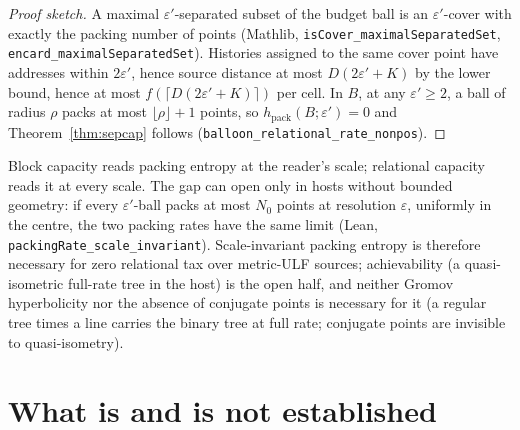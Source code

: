 \documentclass[11pt,a4paper]{article}
\theoremstyle{plain}
\theoremstyle{definition}
\theoremstyle{remark}
\newcommand{\hpack}{h_{\mathrm{pack}}}
\begin{document}
\begin{proof}[Proof sketch]
A maximal $\varepsilon'$-separated subset of the budget ball is an
$\varepsilon'$-cover with exactly the packing number of points (Mathlib,
\texttt{isCover\_maximalSeparatedSet}, \texttt{encard\_maximalSeparatedSet}).
Histories assigned to the same cover point have addresses within
$2\varepsilon'$, hence source distance at most $D(2\varepsilon'+K)$ by the
lower bound, hence at most $f(\lceil D(2\varepsilon'+K)\rceil)$ per cell.
In $B$, at any $\varepsilon'\ge2$, a ball of radius $\rho$ packs at most
$\lfloor\rho\rfloor+1$ points, so $\hpack(B;\varepsilon')=0$ and
Theorem~\ref{thm:sepcap} follows (\texttt{balloon\_relational\_rate\_nonpos}).
\end{proof}

Block capacity reads packing entropy at the reader's scale; relational
capacity reads it at every scale. The gap can open only in hosts without
bounded geometry: if every $\varepsilon'$-ball packs at most $N_0$ points at
resolution $\varepsilon$, uniformly in the centre, the two packing rates have
the same limit (Lean, \texttt{packingRate\_scale\_invariant}). Scale-invariant
packing entropy is therefore necessary for zero relational tax over
metric-ULF sources; achievability (a quasi-isometric full-rate tree in the
host) is the open half, and neither Gromov hyperbolicity nor the absence of
conjugate points is necessary for it (a regular tree times a line carries the
binary tree at full rate; conjugate points are invisible to quasi-isometry).

\section{What is and is not established}
\end{document}
